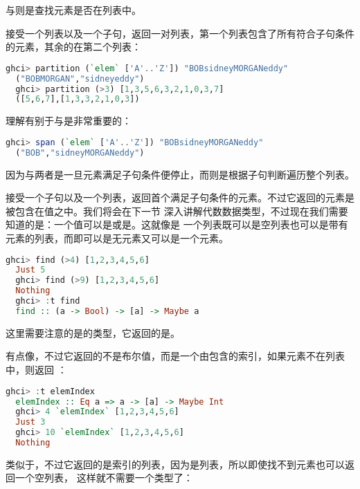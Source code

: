 \documentclass[./main.tex]{subfiles}
\begin{document}
与则是查找元素是否在列表中。

接受一个列表以及一个子句，返回一对列表，第一个列表包含了所有符合子句条件的元素，其余的在第二个列表：

\begin{lstlisting}[language=Haskell]
  ghci> partition (`elem` ['A'..'Z']) "BOBsidneyMORGANeddy"
  ("BOBMORGAN","sidneyeddy")
  ghci> partition (>3) [1,3,5,6,3,2,1,0,3,7]
  ([5,6,7],[1,3,3,2,1,0,3])
\end{lstlisting}

理解有别于与是非常重要的：

\begin{lstlisting}[language=Haskell]
  ghci> span (`elem` ['A'..'Z']) "BOBsidneyMORGANeddy"
  ("BOB","sidneyMORGANeddy")
\end{lstlisting}

因为与两者是一旦元素满足子句条件便停止，而则是根据子句判断遍历整个列表。

接受一个子句以及一个列表，返回首个满足子句条件的元素。不过它返回的元素是被包含在值之中。我们将会在下一节
深入讲解代数数据类型，不过现在我们需要知道的是：一个值可以是或是。这就像是
一个列表既可以是空列表也可以是带有元素的列表，而即可以是无元素又可以是一个元素。

\begin{lstlisting}[language=Haskell]
  ghci> find (>4) [1,2,3,4,5,6]
  Just 5
  ghci> find (>9) [1,2,3,4,5,6]
  Nothing
  ghci> :t find
  find :: (a -> Bool) -> [a] -> Maybe a
\end{lstlisting}

这里需要注意的是的类型，它返回的是。

有点像，不过它返回的不是布尔值，而是一个由包含的索引，如果元素不在列表中，则返回
：

\begin{lstlisting}[language=Haskell]
  ghci> :t elemIndex
  elemIndex :: Eq a => a -> [a] -> Maybe Int
  ghci> 4 `elemIndex` [1,2,3,4,5,6]
  Just 3
  ghci> 10 `elemIndex` [1,2,3,4,5,6]
  Nothing
\end{lstlisting}

类似于，不过它返回的是索引的列表，因为是列表，所以即使找不到元素也可以返回一个空列表，
这样就不需要一个类型了：
\end{document}
